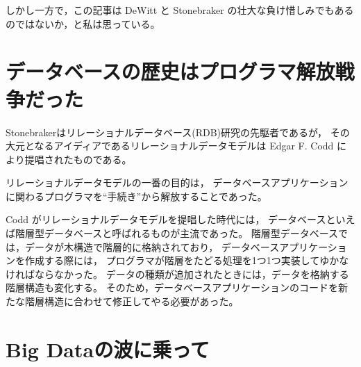 しかし一方で，この記事は DeWitt と Stonebraker の壮大な負け惜しみでもあるのではないか，と私は思っている。

\section{データベースの歴史はプログラマ解放戦争だった}

Stonebrakerはリレーショナルデータベース(RDB)研究の先駆者であるが，
その大元となるアイディアであるリレーショナルデータモデルは Edgar F. Codd により提唱されたものである。

リレーショナルデータモデルの一番の目的は，
データベースアプリケーションに関わるプログラマを``手続き''から解放することであった。

Codd がリレーショナルデータモデルを提唱した時代には，
データベースといえば階層型データベースと呼ばれるものが主流であった。
階層型データベースでは，データが木構造で階層的に格納されており，
データベースアプリケーションを作成する際には，
プログラマが階層をたどる処理を1つ1つ実装してゆかなければならなかった。
データの種類が追加されたときには，データを格納する階層構造も変化する。
そのため，データベースアプリケーションのコードを新たな階層構造に合わせて修正してやる必要があった。


\section{Big Dataの波に乗って}

